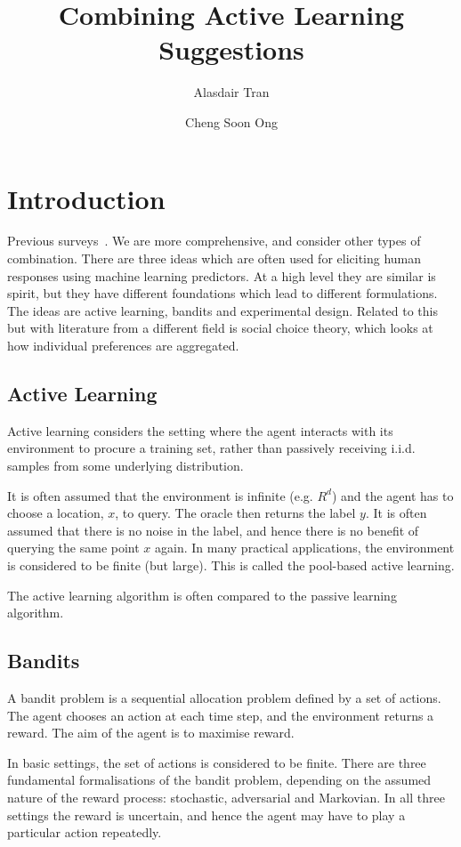 \documentclass[fleqn,10pt,lineno]{wlpeerj} %
\title{Combining Active Learning Suggestions}
\author[1]{Alasdair Tran}
\author[2]{Cheng Soon Ong}
\affil[1]{}
\affil[2]{Machine Learning Research Group, Data61, CSIRO, Australia}
\begin{document}
\flushbottom
\maketitle
\thispagestyle{empty}

\section*{Introduction}

Previous surveys~\cite{baram04, hsu15}.
We are more comprehensive, and consider other types of combination.
There are three ideas which are often used for eliciting human
responses using machine learning predictors. At a high level they are
similar is spirit, but they have different foundations which lead to
different formulations. The ideas are active learning, bandits and
experimental design. Related to this but with literature from a
different field is social choice theory, which looks at
how individual preferences are aggregated.

\subsection*{Active Learning}

Active learning considers the setting where the agent interacts with
its environment to procure a training set, rather than passively
receiving i.i.d. samples from some underlying distribution.

It is often assumed that the environment is infinite (e.g. $R^d$) and
the agent has to choose a location, $x$, to query. The oracle then returns
the label $y$. It is often assumed that there is no noise in the label,
and hence there is no benefit of querying the same point $x$ again. In
many practical applications, the environment is considered to be
finite (but large). This is called the pool-based active learning.

The active learning algorithm is often compared to the passive
learning algorithm.

\subsection*{Bandits}

A bandit problem is a sequential allocation problem defined by a set
of actions. The agent chooses an action at each time step, and the
environment returns a reward. The aim of the agent is to maximise reward.

In basic settings, the set of actions is considered to be
finite. There are three fundamental formalisations of the bandit
problem, depending on the assumed nature of the reward process:
stochastic, adversarial and Markovian. In all three settings the
reward is uncertain, and hence the agent may have to play a particular
action repeatedly.
\end{document}
